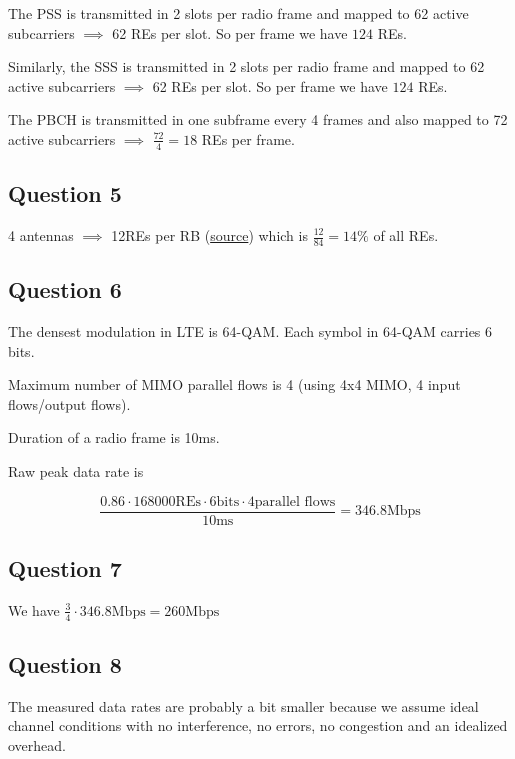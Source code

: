 \documentclass[]{article}
\begin{document}
	The PSS is transmitted in 2 slots per radio frame and mapped to 62 active subcarriers $\implies$ 62 REs per slot. So per frame we have $124$ REs.
	
	Similarly, the SSS is transmitted in 2 slots per radio frame and mapped to 62 active subcarriers $\implies$ 62 REs per slot. So per frame we have $124$ REs.
	
	The PBCH is transmitted in one subframe every 4 frames and also mapped to 72 active subcarriers $\implies$ $\frac{72}{4} = 18$ REs per frame.
	
	\subsection*{Question 5}
	
	4 antennas $\implies$ 12REs per RB (\href{https://marceaucoupechoux.wp.imt.fr/files/2018/02/BdL-4G-eng.pptx.pdf}{source}) which is $\frac{12}{84} = 14\%$ of all REs.
	
	\subsection*{Question 6}
	
	The densest modulation in LTE is 64-QAM. Each symbol in 64-QAM carries 6 bits.
	
	Maximum number of MIMO parallel flows is 4 (using 4x4 MIMO, 4 input flows/output flows).
	
	Duration of a radio frame is 10ms.
	
	Raw peak data rate is
	
	\begin{equation}
		\frac{0.86 \cdot 168000 \text{REs} \cdot 6 \text{bits} \cdot 4 \text{parallel flows}}{10 \text{ms}} = 346.8 \text{Mbps}
	\end{equation}
	
	\subsection*{Question 7}
	
	We have $\frac{3}{4} \cdot 346.8 \text{Mbps} = 260 \text{Mbps}$
	
	\subsection*{Question 8}
	
	The measured data rates are probably a bit smaller because we assume ideal channel conditions with no interference, no errors, no congestion and an idealized overhead.
	
\end{document}
